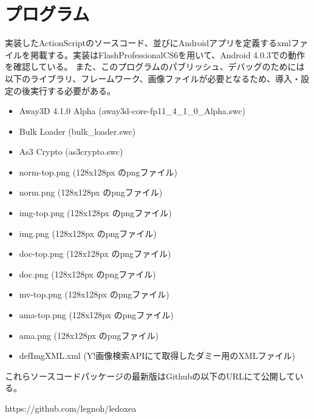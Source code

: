 \chapter{プログラム}
実装したActionScriptのソースコード、並びにAndroidアプリを定義するxmlファイルを掲載する。実装はFlashProfessionalCS6を用いて、Android 4.0.3での動作を確認している。
また、このプログラムのパブリッシュ、デバッグのためには以下のライブラリ、フレームワーク、画像ファイルが必要となるため、導入・設定の後実行する必要がある。
\begin{itemize}
\item Away3D 4.1.0 Alpha (away3d-core-fp11\_4\_1\_0\_Alpha.swc)\cite{away3d}
\item Bulk Loader (bulk\_loader.swc)\cite{bulkloader}
\item As3 Crypto (as3crypto.swc)\cite{as3crypto}
\item norm-top.png (128x128px のpngファイル)
\item norm.png (128x128px のpngファイル)
\item img-top.png (128x128px のpngファイル)
\item img.png (128x128px のpngファイル)
\item doc-top.png (128x128px のpngファイル)
\item doc.png (128x128px のpngファイル)
\item mv-top.png (128x128px のpngファイル)
\item ama-top.png (128x128px のpngファイル)
\item ama.png (128x128px のpngファイル)
\item defImgXML.xml (Y!画像検索APIにて取得したダミー用のXMLファイル)
\end{itemize}

これらソースコードパッケージの最新版はGithubの以下のURLにて公開している。 

https://github.com/legnoh/ledoxea


